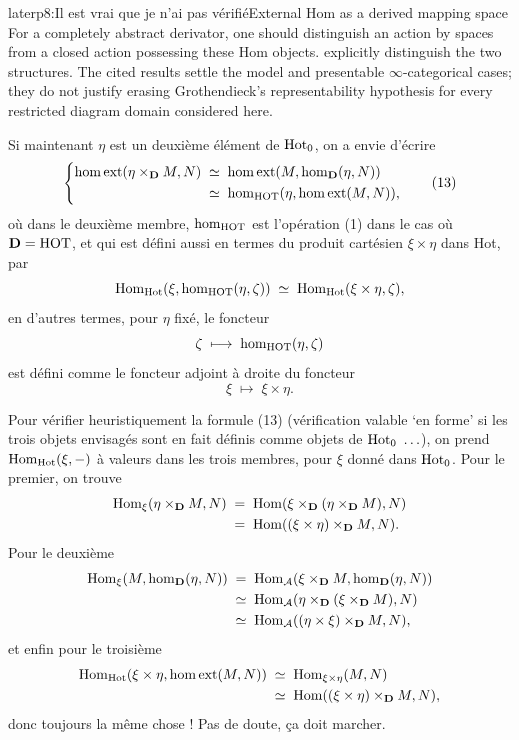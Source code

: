 \begin{dcomment}{later}{p8:Il est vrai que je n’ai pas vérifié}{External Hom as a derived mapping space}
For a completely abstract derivator, one should distinguish an action by spaces from a closed action possessing these Hom objects. \citet[Section 1, pp.~3--4, and Definition 4.2]{GrothShulman2017} explicitly distinguish the two structures. The cited results settle the model and presentable \(\infty\)-categorical cases; they do not justify erasing Grothendieck's representability hypothesis for every restricted diagram domain considered here.
\end{dcomment}


Si maintenant $\eta$ est un deuxième élément de $\mathrm{Hot}_0$, on a envie d’écrire
\[
\left\{
\begin{aligned}
\homext(\eta\times_{\D}M,N) &\;\simeq\;\homext(M,\hm_{\D}(\eta,N))\\
&\;\simeq\;\hm_{\HOT}(\eta,\homext(M,N)),
\end{aligned}
\right.
\tag*{(13)}
\]
où dans le deuxième membre, $\mathrm{hom}_{\mathrm{HOT}}$ est l’opération (1) dans le cas où $\mathbf{D}=\mathrm{HOT}$, et qui est défini aussi en termes du produit cartésien $\xi\times\eta$ dans Hot, par
\[
\mathrm{Hom}_{\mathrm{Hot}}(\xi,\mathrm{hom}_{\mathrm{HOT}}(\eta,\zeta))\;\simeq\;\mathrm{Hom}_{\mathrm{Hot}}(\xi\times\eta,\zeta),
\]
en d’autres termes, pour $\eta$ fixé, le foncteur
\[
\zeta\;\longmapsto\;\mathrm{hom}_{\mathrm{HOT}}(\eta,\zeta)
\]
est défini comme le foncteur adjoint à droite du foncteur
\[
\xi\;\longmapsto\;\xi\times\eta.
\]

Pour vérifier heuristiquement la formule (13) (vérification valable ‘en forme’ si les trois objets envisagés sont en fait définis comme objets de $\mathrm{Hot}_0\ \ldots$), on prend $\mathrm{Hom}_{\mathrm{Hot}}(\xi,-)$ à valeurs dans les trois membres, pour $\xi$ donné dans $\mathrm{Hot}_0$. Pour le premier, on trouve
\[
\begin{aligned}
\mathrm{Hom}_{\xi}(\eta\times_{\mathbf{D}}M,N) &\;=\;\mathrm{Hom}(\xi\times_{\mathbf{D}}(\eta\times_{\mathbf{D}}M),N)\\
&\;=\;\mathrm{Hom}((\xi\times\eta)\times_{\mathbf{D}}M,N).
\end{aligned}
\]
Pour le deuxième
\[
\begin{aligned}
\mathrm{Hom}_{\xi}(M,\mathrm{hom}_{\mathbf{D}}(\eta,N)) &\;=\;\mathrm{Hom}_{\mathcal{A}}(\xi\times_{\mathbf{D}}M,\mathrm{hom}_{\mathbf{D}}(\eta,N))\\
&\;\simeq\;\mathrm{Hom}_{\mathcal{A}}(\eta\times_{\mathbf{D}}(\xi\times_{\mathbf{D}}M),N)\\
&\;\simeq\;\mathrm{Hom}_{\mathcal{A}}((\eta\times\xi)\times_{\mathbf{D}}M,N),
\end{aligned}
\]
et enfin pour le troisième
\[
\begin{aligned}
\mathrm{Hom}_{\mathrm{Hot}}(\xi\times\eta,\mathrm{hom}\,\mathrm{ext}(M,N)) &\;\simeq\;\mathrm{Hom}_{\xi\times\eta}(M,N)\\
&\;\simeq\;\mathrm{Hom}((\xi\times\eta)\times_{\mathbf{D}}M,N),
\end{aligned}
\]
donc toujours la même chose ! Pas de doute, ça doit marcher.

